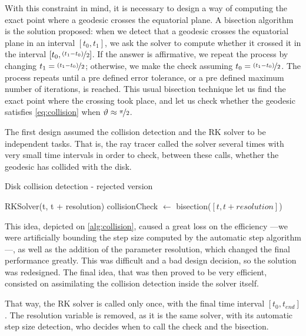 With this constraint in mind, it is necessary to design a way of computing the exact point where a geodesic crosses the equatorial plane. A bisection algorithm is the solution proposed: when we detect that a geodesic crosses the equatorial plane in an interval $[t_0, t_1]$, we ask the solver to compute whether it crossed it in the interval $[t_0, \nicefrac{(t_1 - t_0)}{2}]$. If the answer is affirmative, we repeat the process by changing $t_1 = \nicefrac{(t_1 - t_0)}{2}$; otherwise, we make the check assuming $t_0 = \nicefrac{(t_1 - t_0)}{2}$. The process repeats until a pre defined error tolerance, or a pre defined maximum number of iterations, is reached. This usual bisection technique let us find the exact point where the crossing took place, and let us check whether the geodesic satisfies \autoref{eq:collision} when $\vartheta \approx \nicefrac{\pi}{2}$.

The first design assumed the collision detection and the \ac{RK} solver to be independent tasks. That is, the ray tracer called the solver several times with very small time intervals in order to check, between these calls, whether the geodesic has collided with the disk.

\begin{algorithm}
	\caption{Disk collision detection - rejected version}
	\label{alg:collision}
	\begin{algorithmic}[1]
		\State RKSolver(t, t + resolution)
			\State collisionCheck $\gets$ bisection($[t, t + resolution]$)
		\EndIf
		\EndFor
		\EndFunction
	\end{algorithmic}
\end{algorithm}

This idea, depicted on \ref{alg:collision}, caused a great loss on the efficiency ---we were artificially bounding the step size computed by the automatic step algorithm---, as well as the addition of the parameter resolution, which changed the final performance greatly. This was difficult and a bad design decision, so the solution was redesigned. The final idea, that was then proved to be very efficient, consisted on assimilating the collision detection inside the solver itself.

That way, the \ac{RK} solver is called only once, with the final time interval $[t_0, t_{end}]$. The resolution variable is removed, as it is the same solver, with its automatic step size detection, who decides when to call the check and the bisection.
